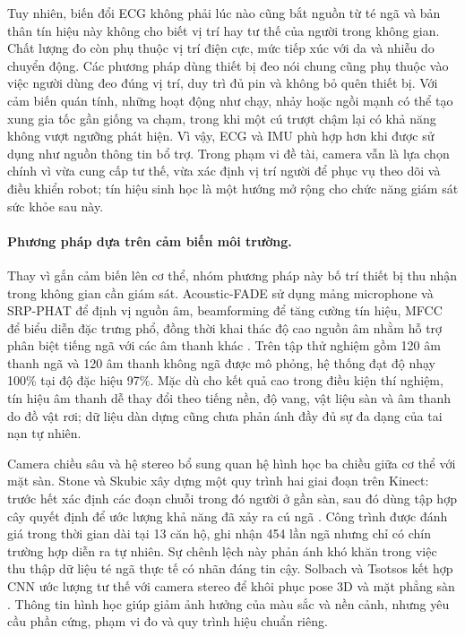 Tuy nhiên, biến đổi ECG không phải lúc nào cũng bắt nguồn từ té ngã và bản thân tín hiệu này không cho biết vị trí hay tư thế của người trong không gian. Chất lượng đo còn phụ thuộc vị trí điện cực, mức tiếp xúc với da và nhiễu do chuyển động. Các phương pháp dùng thiết bị đeo nói chung cũng phụ thuộc vào việc người dùng đeo đúng vị trí, duy trì đủ pin và không bỏ quên thiết bị. Với cảm biến quán tính, những hoạt động như chạy, nhảy hoặc ngồi mạnh có thể tạo xung gia tốc gần giống va chạm, trong khi một cú trượt chậm lại có khả năng không vượt ngưỡng phát hiện. Vì vậy, ECG và IMU phù hợp hơn khi được sử dụng như nguồn thông tin bổ trợ. Trong phạm vi đề tài, camera vẫn là lựa chọn chính vì vừa cung cấp tư thế, vừa xác định vị trí người để phục vụ theo dõi và điều khiển robot; tín hiệu sinh học là một hướng mở rộng cho chức năng giám sát sức khỏe sau này.

\paragraph{Phương pháp dựa trên cảm biến môi trường.}
Thay vì gắn cảm biến lên cơ thể, nhóm phương pháp này bố trí thiết bị thu nhận trong không gian cần giám sát. Acoustic-FADE sử dụng mảng microphone và SRP-PHAT để định vị nguồn âm, beamforming để tăng cường tín hiệu, MFCC để biểu diễn đặc trưng phổ, đồng thời khai thác độ cao nguồn âm nhằm hỗ trợ phân biệt tiếng ngã với các âm thanh khác . Trên tập thử nghiệm gồm 120 âm thanh ngã và 120 âm thanh không ngã được mô phỏng, hệ thống đạt độ nhạy 100\% tại độ đặc hiệu 97\%. Mặc dù cho kết quả cao trong điều kiện thí nghiệm, tín hiệu âm thanh dễ thay đổi theo tiếng nền, độ vang, vật liệu sàn và âm thanh do đồ vật rơi; dữ liệu dàn dựng cũng chưa phản ánh đầy đủ sự đa dạng của tai nạn tự nhiên.

Camera chiều sâu và hệ stereo bổ sung quan hệ hình học ba chiều giữa cơ thể với mặt sàn. Stone và Skubic xây dựng một quy trình hai giai đoạn trên Kinect: trước hết xác định các đoạn chuỗi trong đó người ở gần sàn, sau đó dùng tập hợp cây quyết định để ước lượng khả năng đã xảy ra cú ngã . Công trình được đánh giá trong thời gian dài tại 13 căn hộ, ghi nhận 454 lần ngã nhưng chỉ có chín trường hợp diễn ra tự nhiên. Sự chênh lệch này phản ánh khó khăn trong việc thu thập dữ liệu té ngã thực tế có nhãn đáng tin cậy. Solbach và Tsotsos kết hợp CNN ước lượng tư thế với camera stereo để khôi phục pose 3D và mặt phẳng sàn . Thông tin hình học giúp giảm ảnh hưởng của màu sắc và nền cảnh, nhưng yêu cầu phần cứng, phạm vi đo và quy trình hiệu chuẩn riêng.

